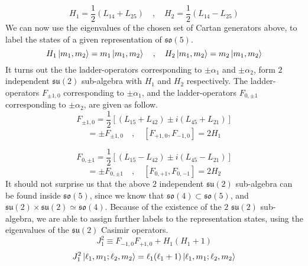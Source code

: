 %
%
\begin{equation}\label{Cartan generators so(5)}
H_1 = \frac{1}{2} (L_{14} + L_{25})
%
\quad , \quad
%
H_2 = \frac{1}{2} (L_{14} - L_{25})
\end{equation}
%
%
We can now use the eigenvalues of the chosen set of Cartan generators above, to label the states of a given representation of $\mathfrak{so}(5)$.
%
%
\begin{equation}
H_1 \ket{m_1,m_2} = m_1 \ket{m_1,m_2}
%
\quad , \quad
%
H_2 \ket{m_1,m_2} = m_2 \ket{m_1,m_2}
\end{equation}
%
%
It turns out the the ladder-operators corresponding to $\pm \alpha_1$ and $\pm \alpha_2$, form $2$ independent $\mathfrak{su}(2)$ sub-algebra with $H_1$ and $H_2$ respectively. The ladder-operators $F_{\pm 1, 0}$ corresponding to $\pm \alpha_1$, and the ladder-operators $F_{0,\pm 1}$ corresponding to $\pm \alpha_2$, are given as follow.
%
%
\begin{equation}
F_{\pm 1, 0} = \frac{1}{2} [(L_{15} + L_{42}) \pm i (L_{45} + L_{21})]
\end{equation}
%
%
\begin{equation}
[H_1, F_{\pm 1, 0}] = \pm F_{\pm 1, 0}
%
\quad , \quad
%
[F_{+1, 0}, F_{-1, 0}] = 2 H_1
\end{equation}
%
%

%
%
\begin{equation}
F_{0,\pm 1} = \frac{1}{2} [(L_{15} - L_{42}) \pm i (L_{45} - L_{21})]
\end{equation}
%
%
\begin{equation}
[H_2, F_{0,\pm 1}] = \pm F_{0,\pm 1}
%
\quad , \quad
%
[F_{0, +1}, F_{0, -1}] = 2 H_2
\end{equation}
%
%
It should not surprise us that the above $2$ independent $\mathfrak{su}(2)$ sub-algebra can be found inside $\mathfrak{so}(5)$, since we know that $\mathfrak{so}(4) \subset \mathfrak{so}(5)$, and $\mathfrak{su}(2) \times \mathfrak{su}(2) \simeq \mathfrak{so}(4)$. Because of the existence of the $2$ $\mathfrak{su}(2)$ sub-algebra, we are able to assign further labels to the representation states, using the eigenvalues of the $\mathfrak{su}(2)$ Casimir operators.
%
%
\begin{equation}
J_1^2 \equiv F_{-1,0} F_{+1,0} + H_1 (H_1 + 1)
\end{equation}
%
%
\begin{equation}
J_1^2 \ket{\ell_1, m_1;\ell_2, m_2} = \ell_1 (\ell_1 + 1) \ket{\ell_1, m_1;\ell_2, m_2}
\end{equation}
%
%

